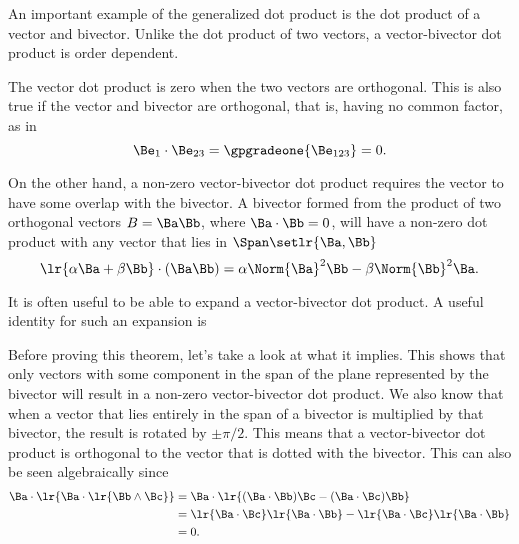 %
%

An important example of the generalized dot product is the dot product of a vector and bivector.
Unlike the dot product of two vectors, a vector-bivector dot product is order dependent.

The vector dot product is zero when the two vectors are orthogonal.
This is also true if the vector and bivector are orthogonal, that is, having no common factor, as in
\begin{equation}\label{eqn:generalizedDot_vectorBivector:661}
\Be_1 \cdot \Be_{23} = \gpgradeone{ \Be_{123} } = 0.
\end{equation}

On the other hand, a non-zero vector-bivector dot product requires the vector to have some overlap with the bivector.
A bivector formed from the product of two orthogonal vectors \( B = \Ba \Bb \), where \( \Ba \cdot \Bb = 0 \), will have a non-zero dot product with any vector that lies in \( \Span \setlr{ \Ba, \Bb} \)
\begin{equation}\label{eqn:generalizedDot_vectorBivector:682}
\lr{ \alpha \Ba + \beta \Bb } \cdot (\Ba\Bb)
=
\alpha \Norm{\Ba}^2 \Bb - \beta \Norm{\Bb}^2 \Ba.
\end{equation}

It is often useful to be able to expand a vector-bivector dot product.
A useful identity for such an expansion is

Before proving this theorem, let's take a look at what it implies.
This shows that only vectors with some component in the span of the plane represented by the bivector will result in a non-zero vector-bivector dot product.
We also know that when a vector that lies entirely in the span of a bivector is multiplied by that bivector, the result is rotated by \( \pm \pi/2 \).
This means that a vector-bivector dot product is orthogonal to the vector that is dotted with the bivector.
This can also be seen algebraically since
\begin{equation}\label{eqn:generalizedDot_vectorBivector:1120}
\begin{aligned}
\Ba \cdot \lr{ \Ba \cdot \lr{ \Bb \wedge \Bc }}
&= \Ba \cdot \lr{ ( \Ba \cdot \Bb ) \Bc -( \Ba \cdot \Bc ) \Bb } \\
&= \lr{ \Ba \cdot \Bc } \lr{ \Ba \cdot \Bb } - \lr{ \Ba \cdot \Bc } \lr{ \Ba \cdot \Bb } \\
&= 0.
\end{aligned}
\end{equation}

